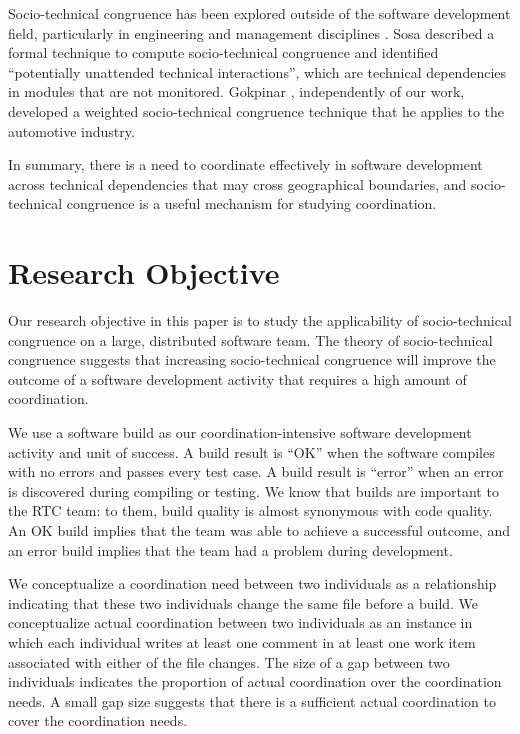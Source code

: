 \documentclass[12pt,oneside]{book}
\begin{document}
Socio-technical congruence has been explored outside of the software development field, particularly in engineering and management disciplines \cite{henderson1990,sosa2004:manage,gokpinar2010,sosa2008}. Sosa \cite{sosa2008} described a formal technique to compute socio-technical congruence and identified ``potentially unattended technical interactions'', which are technical dependencies in modules that are not monitored. Gokpinar \cite{gokpinar2010}, independently of our work, developed a weighted socio-technical congruence technique that he applies to the automotive industry.

In summary, there is a need to coordinate effectively in software development across technical dependencies that may cross geographical boundaries, and socio-technical congruence is a useful mechanism for studying coordination.




\section{Research Objective}
\label{sec:objective}

Our research objective in this paper is to study the applicability of socio-technical congruence on a large, distributed software team. The theory of socio-technical congruence suggests that increasing socio-technical congruence will improve the outcome of a software development activity that requires a high amount of coordination.

We use a software build as our coordination-intensive software development activity and unit of success. A build result is ``OK'' when the software compiles with no errors and passes every test case. A build result is ``error'' when an error is discovered during compiling or testing. We know that builds are important to the RTC team: to them, build quality is almost synonymous with code quality. An OK build implies that the team was able to achieve a successful outcome, and an error build implies that the team had a problem during development.

We conceptualize a coordination need between two individuals as a relationship indicating that these two individuals change the same file before a build. We conceptualize actual coordination between two individuals as an instance in which each individual writes at least one comment in at least one work item associated with either of the file changes. The size of a gap between two individuals indicates the proportion of actual coordination over the coordination needs. A small gap size suggests that there is a sufficient actual coordination to cover the coordination needs.
\end{document}
